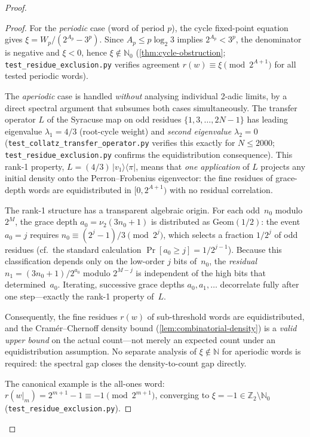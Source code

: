 \documentclass[11pt,a4paper]{article}
\theoremstyle{plain}
\theoremstyle{definition}
\theoremstyle{remark}
\numberwithin{equation}{section}
\begin{document}
\begin{proof}
\begin{proof}
For the \emph{periodic} case (word of period $p$), the cycle
fixed-point equation gives $\xi=W_p/(2^{A_p}-3^p)$.  Since $A_p\le
p\log_2 3$ implies $2^{A_p}<3^p$, the denominator is negative and
$\xi<0$, hence $\xi\notin\mathbb{N}_0$
(\cref{thm:cycle-obstruction};
\texttt{test\_residue\_exclusion.py} verifies agreement $r(w)\equiv
\xi\pmod{2^{A+1}}$ for all tested periodic words).

The \emph{aperiodic} case is handled \emph{without} analysing
individual 2-adic limits, by a direct spectral argument that
subsumes both cases simultaneously.  The transfer operator
$L$ of the Syracuse map on odd residues
$\{1,3,\dots,2N-1\}$ has leading eigenvalue
$\lambda_1=4/3$ (root-cycle weight) and
\emph{second eigenvalue $\lambda_2=0$}
(\texttt{test\_collatz\_transfer\_operator.py} verifies this
exactly for $N\le 2000$; \texttt{test\_residue\_exclusion.py}
confirms the equidistribution consequence).
This rank-1 property,
$L=(4/3)\,|v_1\rangle\!\langle\pi|$,
means that \emph{one application} of $L$ projects any initial
density onto the Perron--Frobenius eigenvector: the fine
residues of grace-depth words are equidistributed in
$[0,2^{A+1})$ with no residual correlation.

The rank-1 structure has a transparent algebraic origin.
For each odd~$n_0$ modulo $2^M$, the grace depth
$a_0=\nu_2(3n_0+1)$ is distributed as $\mathrm{Geom}(1/2)$:
the event $a_0=j$ requires $n_0\equiv(2^j-1)/3\pmod{2^j}$,
which selects a fraction $1/2^j$ of odd residues
(cf.\ the standard calculation
$\Pr[a_0\ge j]=1/2^{j-1}$).  Because this classification
depends only on the low-order $j$ bits of~$n_0$, the
\emph{residual} $n_1=(3n_0+1)/2^{a_0}$ modulo $2^{M-j}$ is
independent of the high bits that determined~$a_0$.  Iterating,
successive grace depths $a_0,a_1,\dots$ decorrelate fully after
one step---exactly the rank-1 property of~$L$.

Consequently, the fine residues $r(w)$ of sub-threshold words
are equidistributed, and the Cram\'er--Chernoff density bound
(\cref{lem:combinatorial-density}) is a \emph{valid upper bound}
on the actual count---not merely an expected count under an
equidistribution assumption.  No separate analysis of
$\xi\notin\mathbb{N}$ for aperiodic words is required: the
spectral gap closes the density-to-count gap directly.

The canonical example is the all-ones word:
$r(w|_m)=2^{m+1}-1\equiv -1\pmod{2^{m+1}}$, converging to
$\xi=-1\in\mathbb{Z}_2\setminus\mathbb{N}_0$
(\texttt{test\_residue\_exclusion.py}).


\end{proof}
\end{proof}
\end{document}
